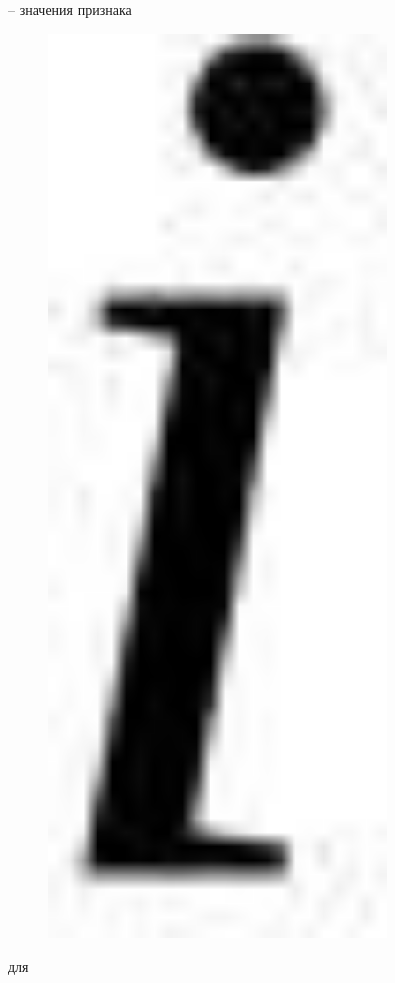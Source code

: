 -- значения признака \begin{figure}[H]
	\centering
	\includegraphics[width=0.8\textwidth]{assets/102}
	\caption*{}
\end{figure} для
